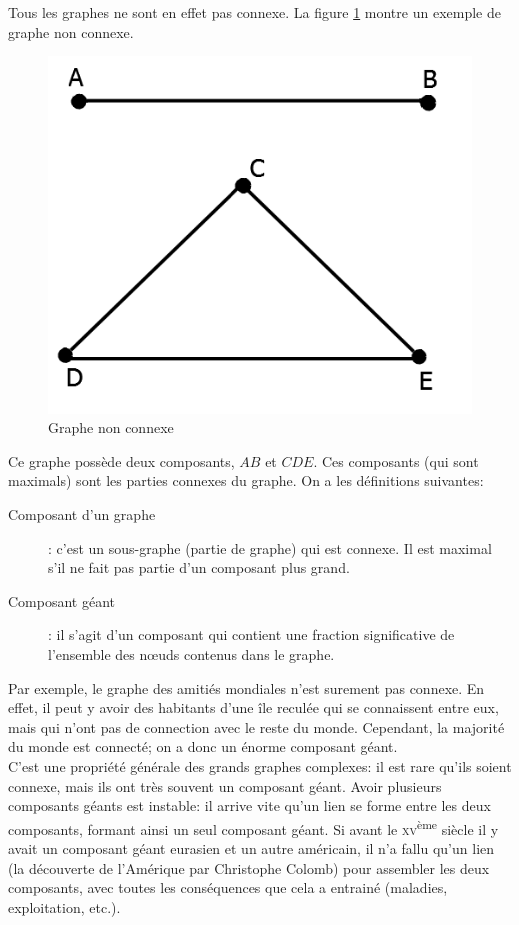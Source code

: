 Tous les graphes ne sont en effet pas connexe. La figure \ref{graphe_non_connexe} montre un exemple de graphe non connexe.
	\begin{figure}
	\center
	\includegraphics[scale=0.3]{images/18_graphe_non_connexe.png}
	\caption{\label{graphe_non_connexe} Graphe non connexe}
	\end{figure}
Ce graphe possède deux composants, $AB$ et $CDE$. Ces composants (qui sont maximals) sont les parties connexes du graphe. On a les définitions suivantes:
	\begin{description}
    \item[Composant d'un graphe]: c'est un sous-graphe (partie de graphe) qui est connexe. Il est maximal s'il ne fait pas partie d'un composant plus grand.
    \item[Composant géant] : il s'agit d'un composant qui contient une fraction significative de l'ensemble des n\oe uds contenus dans le graphe.
    \end{description}
    
    Par exemple, le graphe des amitiés mondiales n'est surement pas connexe. En effet, il peut y avoir des habitants d'une île reculée qui se connaissent entre eux, mais qui n'ont pas de connection avec le reste du monde. Cependant, la majorité du monde est connecté; on a donc un énorme composant géant.\\
    
    C'est une propriété générale des grands graphes complexes: il est rare qu'ils soient connexe, mais ils ont très souvent un composant géant. Avoir plusieurs composants géants est instable: il arrive vite qu'un lien se forme entre les deux composants, formant ainsi un seul composant géant. Si avant le \textsc{xv}\textsuperscript{ème} siècle il y avait un composant géant eurasien et un autre américain, il n'a fallu qu'un lien (la découverte de l'Amérique par Christophe Colomb) pour assembler les deux composants, avec toutes les conséquences que cela a entrainé (maladies, exploitation, etc.).\\
    
